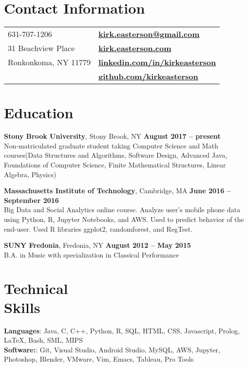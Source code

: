 \documentclass[margin,line]{res}
\begin{document}

\begin{resume}
\section{\sc Contact Information}

\vspace{.05in}
\begin{tabular}{@{}p{3.5in}p{3in}}
631-707-1206 & {\bf \href{mailto:kirk.easterson@gmail.com}{kirk.easterson@gmail.com}} \\
31 Beachview Place &  {\bf \href{http://www.kirkeasterson.com}{kirk.easterson.com}}\\
Ronkonkoma, NY 11779 &  {\bf \href{http://www.linkedin.com/in/kirkeasterson}{linkedin.com/in/kirkeasterson}}\\
& {\bf \href{https://www.github.com/kirkeasterson}{github.com/kirkeasterson}}
\end{tabular}

\section{\sc Education}
{\bf Stony Brook University}, Stony Brook, NY \hfill {\bf August 2017 -- present}\\
Non-matriculated graduate student taking Computer Science and Math courses(Data Structures and Algorithms, Software Design, Advanced Java, Foundations of Computer Science, Finite Mathematical Structures, Linear Algebra, Physics)

{\bf Massachusetts Institute of Technology}, Cambridge, MA \hfill {\bf June 2016 -- September 2016}\\
Big Data and Social Analytics online course. Analyze user's mobile phone data using Python, R, Jupyter Notebooks, and AWS. Used to predict behavior of the end-user. Used R libraries ggplot2, randomforest, and RegTest.

{\bf SUNY Fredonia}, Fredonia, NY \hfill {\bf August 2012 -- May 2015}\\
B.A. in Music with specialization in Classical Performance

\section{\sc Technical\\Skills}
{\bf Languages}:  Java, C, C++, Python, R, SQL, HTML, CSS, Javascript, Prolog, {\LaTeX}, Bash, SML, MIPS\\
{\bf Software:}: Git, Visual Studio, Android Studio, MySQL, AWS, Jupyter, Photoshop, Blender, VMware, Vim, Emacs, Tableau, Pro Tools


\end{resume}
\end{document}
